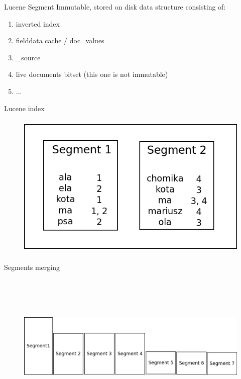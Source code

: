 \documentclass{beamer}
\begin{document}
\begin{frame}{Lucene Segment}
	Immutable, stored on disk data structure consisting of:
	\begin{enumerate}
		\item inverted index
		\item fielddata cache / doc\_values
		\item \_source
		\item live documents bitset (this one is not immutable)
		\item ...
	\end{enumerate}
\end{frame}

\begin{frame}{Lucene index}
	\begin{figure}
		\includegraphics[width=\textwidth,height=7cm,keepaspectratio=true]{lucene-index}
	\end{figure}
\end{frame}
\begin{frame}{Segments merging}
	\begin{figure}
		\includegraphics[width=\textwidth,height=7cm,keepaspectratio=true]{segments}
	\end{figure}
\end{frame}
\end{document}
